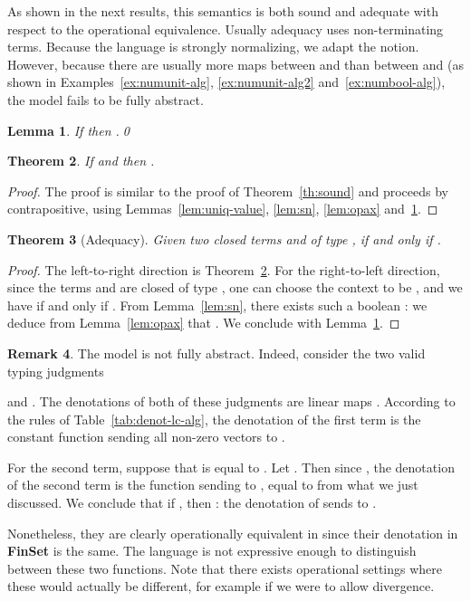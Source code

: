 \documentclass[10pt]{article}
\theoremstyle{plain}
\newtheorem{theorem}{Theorem}
\newtheorem{lemma}[theorem]{Lemma}
\theoremstyle{definition}
\newtheorem{remark}[theorem]{Remark}
\newcommand{\FinSet}{\mbox{\bf FinSet}}
\begin{document}
As shown in the next results, this semantics is both sound and
adequate with respect to the operational equivalence.
Usually adequacy uses non-terminating terms. Because the
language is strongly normalizing, we adapt the notion.
However, because there are usually more maps between  and
 than between  and  (as shown
in Examples~\ref{ex:numunit-alg}, \ref{ex:numunit-alg2}
and~\ref{ex:numbool-alg}), the model fails to be fully abstract.

\begin{lemma}
  \label{lem:axdenot-st-alg}
  If  then .\qed
\end{lemma}


\begin{theorem}
  \label{th:sound-st-alg}
  If  and  then 
  .
\end{theorem}

\begin{proof}
  The proof is similar to the proof of Theorem~\ref{th:sound} and
  proceeds by contrapositive, using Lemmas~\ref{lem:uniq-value},
  \ref{lem:sn}, \ref{lem:opax} and~\ref{lem:axdenot-st-alg}.
\end{proof}

\begin{theorem}[Adequacy]
  Given two closed terms  and  of type ,  if and
  only if .
\end{theorem}

\begin{proof}
  The left-to-right direction is Theorem~\ref{th:sound-st-alg}. For
  the right-to-left direction, since the terms  and  are closed
  of type , one can choose the context  to be , and
  we have  if and only if . From
  Lemma~\ref{lem:sn}, there exists such a boolean : we deduce from
  Lemma~\ref{lem:opax} that . We conclude with
  Lemma~\ref{lem:axdenot-st-alg}.
\end{proof}

\begin{remark}
\label{rem:notfullyabst}
The model  is not fully abstract. 
Indeed, consider the two valid typing judgments

and
.
The denotations of both of these judgments are linear maps 
. According to the rules of
Table~\ref{tab:denot-lc-alg}, the denotation of the first term is 
the constant function sending all non-zero
vectors  to .

For the second term,
suppose that  is 
equal to
.
Let .
Then since , 
the denotation of the second term is the function sending 
to , equal to
 from what we just discussed.
We conclude that if , then : the denotation of
 sends  to .

Nonetheless, they are clearly operationally equivalent in  since their denotation in {\FinSet} is the same.
The language is not expressive enough to distinguish between these two
functions. Note that there exists operational settings where these
would actually be different, for example if we were to allow divergence.
\end{remark}
\end{document}
